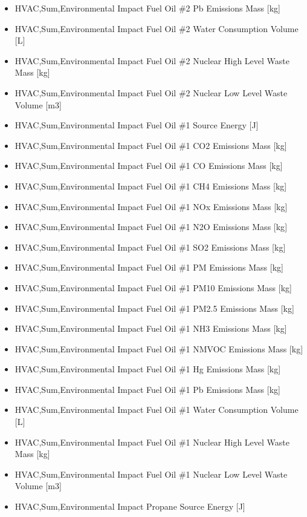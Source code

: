 \begin{itemize}
\item
  HVAC,Sum,Environmental Impact Fuel Oil \#2 Pb Emissions Mass {[}kg{]}
\item
  HVAC,Sum,Environmental Impact Fuel Oil \#2 Water Consumption Volume {[}L{]}
\item
  HVAC,Sum,Environmental Impact Fuel Oil \#2 Nuclear High Level Waste Mass {[}kg{]}
\item
  HVAC,Sum,Environmental Impact Fuel Oil \#2 Nuclear Low Level Waste Volume {[}m3{]}
\item
  HVAC,Sum,Environmental Impact Fuel Oil \#1 Source Energy {[}J{]}
\item
  HVAC,Sum,Environmental Impact Fuel Oil \#1 CO2 Emissions Mass {[}kg{]}
\item
  HVAC,Sum,Environmental Impact Fuel Oil \#1 CO Emissions Mass {[}kg{]}
\item
  HVAC,Sum,Environmental Impact Fuel Oil \#1 CH4 Emissions Mass {[}kg{]}
\item
  HVAC,Sum,Environmental Impact Fuel Oil \#1 NOx Emissions Mass {[}kg{]}
\item
  HVAC,Sum,Environmental Impact Fuel Oil \#1 N2O Emissions Mass {[}kg{]}
\item
  HVAC,Sum,Environmental Impact Fuel Oil \#1 SO2 Emissions Mass {[}kg{]}
\item
  HVAC,Sum,Environmental Impact Fuel Oil \#1 PM Emissions Mass {[}kg{]}
\item
  HVAC,Sum,Environmental Impact Fuel Oil \#1 PM10 Emissions Mass {[}kg{]}
\item
  HVAC,Sum,Environmental Impact Fuel Oil \#1 PM2.5 Emissions Mass {[}kg{]}
\item
  HVAC,Sum,Environmental Impact Fuel Oil \#1 NH3 Emissions Mass {[}kg{]}
\item
  HVAC,Sum,Environmental Impact Fuel Oil \#1 NMVOC Emissions Mass {[}kg{]}
\item
  HVAC,Sum,Environmental Impact Fuel Oil \#1 Hg Emissions Mass {[}kg{]}
\item
  HVAC,Sum,Environmental Impact Fuel Oil \#1 Pb Emissions Mass {[}kg{]}
\item
  HVAC,Sum,Environmental Impact Fuel Oil \#1 Water Consumption Volume {[}L{]}
\item
  HVAC,Sum,Environmental Impact Fuel Oil \#1 Nuclear High Level Waste Mass {[}kg{]}
\item
  HVAC,Sum,Environmental Impact Fuel Oil \#1 Nuclear Low Level Waste Volume {[}m3{]}
\item
  HVAC,Sum,Environmental Impact Propane Source Energy {[}J{]}

\end{itemize}

